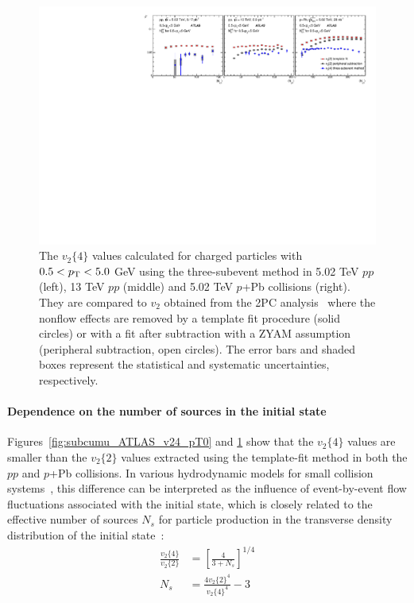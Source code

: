 \begin{figure}[H]
\centering
\includegraphics[width=.95\linewidth]{figs/chapter_subcumu/ATLAS_v24_pT1.pdf}
\caption{The $v_2\{4\}$ values calculated for charged particles with $0.5<p_\text{T}<5.0$ GeV using the three-subevent method in 5.02 TeV $pp$ (left), 13 TeV $pp$ (middle) and 5.02 TeV $p$+Pb collisions (right). They are compared to $v_2$ obtained from the 2PC analysis~\cite{Aad:2014lta, Aaboud:2016yar} where the nonflow effects are removed by a template fit procedure (solid circles) or with a fit after subtraction with a ZYAM assumption (peripheral subtraction, open circles). The error bars and shaded boxes represent the statistical and systematic uncertainties, respectively.}
\label{fig:subcumu_ATLAS_v24_pT1}
\end{figure}



\paragraph{Dependence on the number of sources in the initial state}

Figures~\ref{fig:subcumu_ATLAS_v24_pT0} and \ref{fig:subcumu_ATLAS_v24_pT1} show that the $v_2\{4\}$ values are smaller than the $v_2\{2\}$ values extracted using the template-fit method in both the $pp$ and $p$+Pb collisions. In various hydrodynamic models for small collision systems~\cite{Bzdak:2013rya, Yan:2013laa}, this difference can be interpreted as the influence of event-by-event flow fluctuations associated with the initial state, which is closely related to the effective number of sources $N_s$ for particle production in the transverse density distribution of the initial state~\cite{Yan:2013laa}:
\begin{equation}
\begin{split}
\frac{v_2\{4\}}{v_2\{2\}} &= [\frac{4}{3+N_s}]^{1/4} \\
N_s &= \frac{4v_2\{2\}^4}{v_2\{4\}^4}-3
\end{split}
\end{equation}

